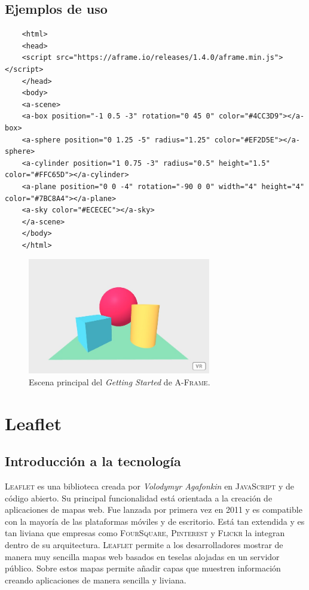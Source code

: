 \documentclass[a4paper, 11pt]{book}
\begin{document}
\subsection{Ejemplos de uso}
\begin{verbatim}
	<html>
	<head>
	<script src="https://aframe.io/releases/1.4.0/aframe.min.js"></script>
	</head>
	<body>
	<a-scene>
	<a-box position="-1 0.5 -3" rotation="0 45 0" color="#4CC3D9"></a-box>
	<a-sphere position="0 1.25 -5" radius="1.25" color="#EF2D5E"></a-sphere>
	<a-cylinder position="1 0.75 -3" radius="0.5" height="1.5" color="#FFC65D"></a-cylinder>
	<a-plane position="0 0 -4" rotation="-90 0 0" width="4" height="4" color="#7BC8A4"></a-plane>
	<a-sky color="#ECECEC"></a-sky>
	</a-scene>
	</body>
	</html>
\end{verbatim}
\begin{figure}[h]
	\centering
	\includegraphics[width=8cm, keepaspectratio]{img/gettingstarted_Aframe.jpg}
	\caption{Escena principal del \emph{Getting Started} de \textsc{A-Frame}.}
	\label{fig:AFrameGettingStarted}
\end{figure}
\section{Leaflet}
\label{sec:leaflet}
\subsection{Introducción a la tecnología}
\textsc{Leaflet} es una biblioteca creada por \emph{Volodymyr Agafonkin} en \textsc{JavaScript} y de código abierto.
Su principal funcionalidad está orientada a la creación de aplicaciones de mapas web. Fue lanzada por primera vez en 2011 y es compatible con la mayoría de las plataformas móviles y de escritorio.
Está tan extendida y es tan liviana que empresas como \textsc{FourSquare}, \textsc{Pinterest} y \textsc{Flickr} la integran dentro de su arquitectura.
\textsc{Leaflet} permite a los desarrolladores mostrar de manera muy sencilla mapas web basados en teselas alojadas en un servidor público. Sobre estos mapas permite añadir capas que muestren información creando aplicaciones de manera sencilla y liviana.
\end{document}
